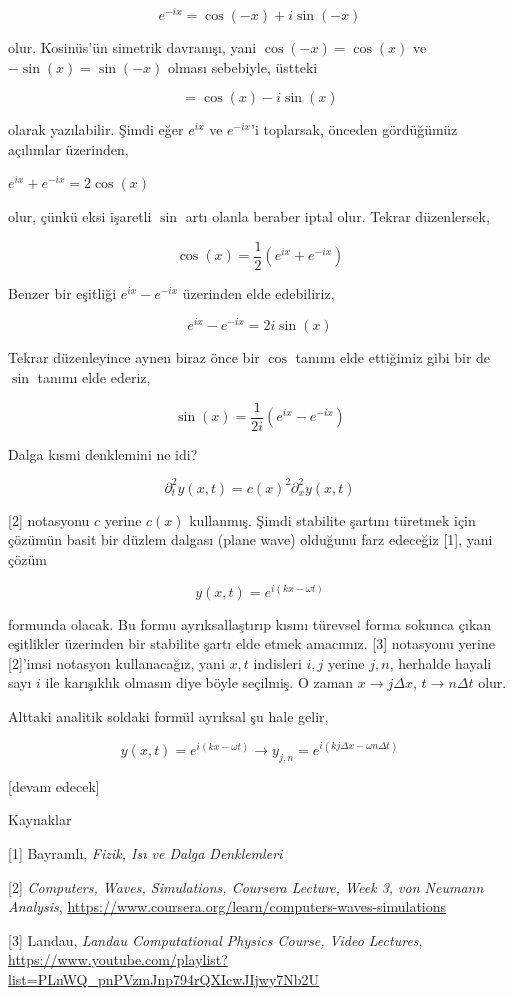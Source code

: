 \documentclass[12pt,fleqn]{article}\usepackage{../../common}
\begin{document}
$$
e^{-ix} = \cos (-x) + i\sin(-x)
$$

olur. Kosinüs'ün simetrik davranışı, yani $\cos(-x)=\cos(x)$ ve
$-\sin(x)=\sin(-x)$ olması sebebiyle, üstteki 

$$
= \cos(x) - i\sin(x)
$$

olarak yazılabilir. Şimdi eğer $e^{ix}$ ve $e^{-ix}$'i toplarsak, önceden
gördüğümüz açılımlar üzerinden,

$
e^{ix} + e^{-ix} = 2\cos(x)
$

olur, çünkü eksi işaretli $\sin$ artı olanla beraber iptal olur. Tekrar
düzenlersek,

$$
\cos(x) = \frac{1}{2} (e^{ix} + e^{-ix})
$$

Benzer bir eşitliği $e^{ix} - e^{-ix}$ üzerinden elde edebiliriz,

$$
e^{ix} - e^{-ix} = 2i\sin(x)
$$

Tekrar düzenleyince aynen biraz önce bir $\cos$ tanımı elde ettiğimiz gibi
bir de $\sin$ tanımı elde ederiz,

$$
\sin(x) = \frac{1}{2i} (e^{ix} - e^{-ix})
$$

Dalga kısmi denklemini ne idi?

$$
\partial_t^2 y(x,t) = c(x)^2 \partial_x^2 y(x,t)
$$

[2] notasyonu $c$ yerine $c(x)$ kullanmış. Şimdi stabilite şartını türetmek için
çözümün basit bir düzlem dalgası (plane wave) olduğunu farz edeceğiz [1], yani
çözüm

$$
y(x,t) = e^{i(kx-\omega t)}
$$

formunda olacak. Bu formu ayrıksallaştırıp kısmı türevsel forma sokunca çıkan
eşitlikler üzerinden bir stabilite şartı elde etmek amacımız. [3] notasyonu
yerine [2]'imsi notasyon kullanacağız, yani $x,t$ indisleri $i,j$ yerine $j,n$,
herhalde hayali sayı $i$ ile karışıklık olmasın diye böyle seçilmiş. O zaman $x
\to j \Delta x$, $t \to n \Delta t$ olur.

Alttaki analitik soldaki formül ayrıksal şu hale gelir,

$$
y(x,t) = e^{i(kx - \omega t)} \to
y_{j,n} = e^{i(kj\Delta x - \omega n \Delta t)}
$$


[devam edecek]

Kaynaklar

[1] Bayramlı, {\em Fizik, Isı ve Dalga Denklemleri}

[2] {\em Computers, Waves, Simulations, Coursera Lecture, Week 3, von Neumann Analysis},
    \url{https://www.coursera.org/learn/computers-waves-simulations}

[3] Landau, {\em Landau Computational Physics Course, Video Lectures},
    \url{https://www.youtube.com/playlist?list=PLnWQ_pnPVzmJnp794rQXIcwJIjwy7Nb2U}
\end{document}
